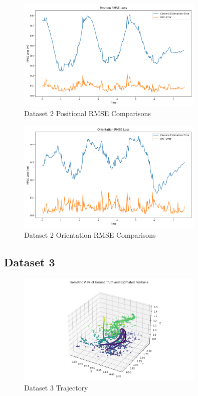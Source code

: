 \documentclass{article}
\begin{document}
\begin{figure}[H]
    \centering
    \includegraphics[width=0.8\textwidth]{./imgs/task4/studentdata2_ukf_position_rmse.png}
    \caption{Dataset 2 Positional RMSE Comparisons}
\end{figure}

\begin{figure}[H]
    \centering
    \includegraphics[width=0.8\textwidth]{./imgs/task4/studentdata2_ukf_orientation_rmse.png}
    \caption{Dataset 2 Orientation RMSE Comparisons}
\end{figure}

\subsection*{Dataset 3}

\begin{figure}[H]
    \centering
    \includegraphics[width=0.8\textwidth]{./imgs/task4/studentdata3_ukf_isometric.png}
    \caption{Dataset 3 Trajectory}
\end{figure}
\end{document}
